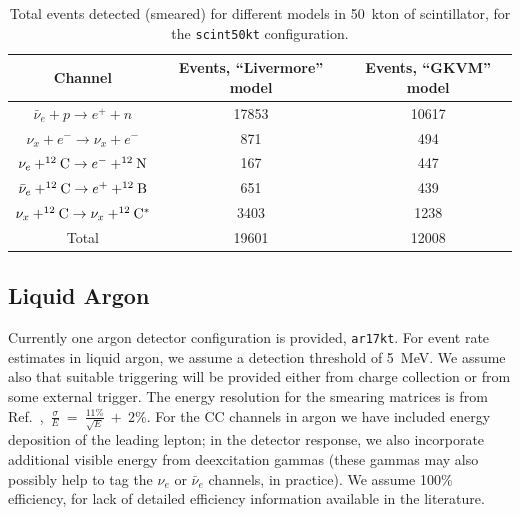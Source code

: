 \documentclass[12pt]{article}
\begin{document}
\begin{table}[h]
\centering
\begin{tabular}{|c|c|c|}
\hline
Channel & Events, ``Livermore'' model & Events, ``GKVM'' model  \\
\hline
   $\bar{\nu}_e+ p \rightarrow e^+ + n$                  &  17853 &   10617\\
$\nu_x + e^- \rightarrow \nu_x + e^-$                           & 871 &   494\\
$\nu_e + ^{12}{\rm C} \rightarrow e^- + ^{12}{\rm N}$         & 167  &  447  \\
$\bar{\nu}_e + ^{12}{\rm C} \rightarrow e^+ + ^{12}{\rm B}$  & 651 &  439 \\


$\nu_x + ^{12}{\rm C} \rightarrow \nu_x+ ^{12}{\rm C}^*$
                         &  3403 &  1238 \\ \hline
Total &  19601 & 12008 \\ \hline
\end{tabular}
\caption{Total events detected (smeared) for different models in 50~kton of scintillator, for the
\texttt{scint50kt} configuration. }
\label{tab:scinttable}
\end{table}


\subsection{Liquid Argon}

Currently one argon detector configuration is provided,
\texttt{ar17kt}.  For event rate estimates in liquid argon, we assume
a detection threshold of 5~MeV.  We assume also that suitable
triggering will be provided either from charge collection or from some
external trigger.  The energy resolution for the smearing matrices is
from
Ref.~\cite{Amoruso:2003sw},~$\frac{\sigma}{E}~=~\frac{11\%}{\sqrt{E}}~+~2\%$.
For the CC channels in argon we have included energy deposition of the
leading lepton; in the detector response, we also incorporate
additional visible energy from deexcitation gammas (these gammas may
also possibly help to tag the $\nu_e$ or $\bar{\nu}_e$ channels,
in practice).  We assume 100\%
efficiency, for lack of detailed efficiency information available in
the literature.
\end{document}
